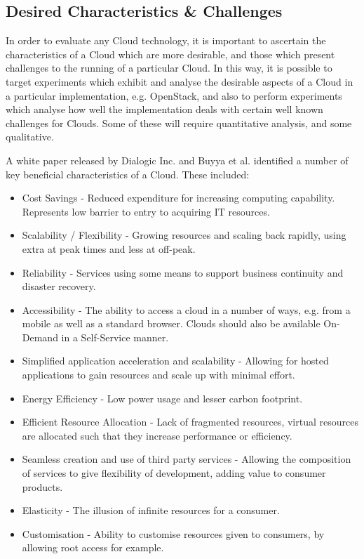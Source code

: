 \subsection{Desired Characteristics \& Challenges}
In order to evaluate any Cloud technology, it is important to ascertain the characteristics of a Cloud which are more desirable, and those which present challenges to the running of a particular Cloud. In this way, it is possible to target experiments which exhibit and analyse the desirable aspects of a Cloud in a particular implementation, e.g. OpenStack, and also to perform experiments which analyse how well the implementation deals with certain well known challenges for Clouds. Some of these will require quantitative analysis, and some qualitative. 

A white paper released by Dialogic Inc.\cite{dialogiccloud} and Buyya et al.\cite{masteringcloudcomputing}\cite{principlesparadigms} identified a number of key beneficial characteristics of a Cloud. These included:

\begin{itemize}
\itemsep0em
\item Cost Savings - Reduced expenditure for increasing computing capability. Represents low barrier to entry to acquiring IT resources. 
\item Scalability / Flexibility - Growing resources and scaling back rapidly, using extra at peak times and less at off-peak. 
\item Reliability - Services using some means to support business continuity and disaster recovery. 
\item Accessibility - The ability to access a cloud in a number of ways, e.g. from a mobile as well as a standard browser. Clouds should also be available On-Demand in a Self-Service manner. 
\item Simplified application acceleration and scalability - Allowing for hosted applications to gain resources and scale up with minimal effort.
\item Energy Efficiency - Low power usage and lesser carbon footprint.
\item Efficient Resource Allocation - Lack of fragmented resources, virtual resources are allocated such that they increase performance or efficiency. 
\item Seamless creation and use of third party services - Allowing the composition of services to give flexibility of development, adding value to consumer products.
\item Elasticity - The illusion of infinite resources for a consumer. 
\item Customisation - Ability to customise resources given to consumers, by allowing root access for example.
\end{itemize}

